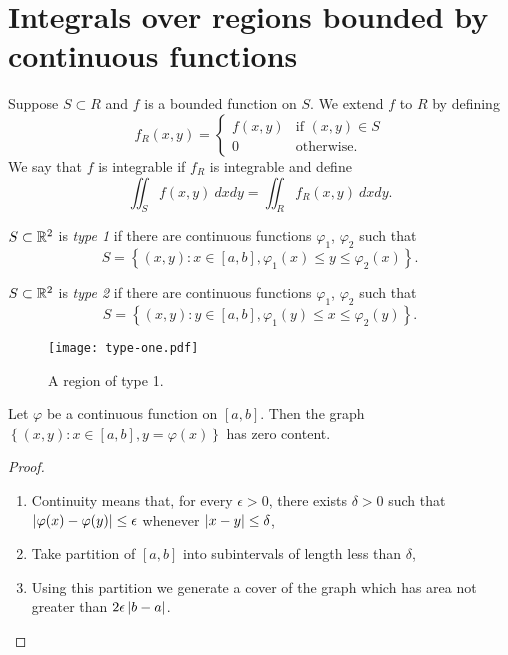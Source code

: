 \section{Integrals over regions bounded by continuous functions}

\begin{definition*}
    Suppose \(S\subset R\) and \(f\) is a bounded function on \(S\).
    We extend \(f\) to \(R\) by defining
    \[
        f_R(x,y) = \begin{cases}
            f(x,y) & \text{if \((x,y)\in S\)} \\
            0      & \text{otherwise}.
        \end{cases}
    \]
    We say that \(f\) is integrable if \(f_{R}\) is integrable and define
    \[
        \iint_{S} f(x,y) \ dxdy = \iint_{R} f_{R}(x,y) \ dx dy.
    \]
\end{definition*}


\begin{definition}[type 1]
    \(S \subset \mathbb{R}^2\) is \emph{type 1} if there are continuous functions \(\varphi_1\), \(\varphi_2\) such that
    \[
        S = \left\{(x,y): x \in [a,b], \varphi_1(x) \leq y \leq \varphi_2(x)\right\}.
    \]
\end{definition}
\begin{definition}[type 2]
    \(S \subset \mathbb{R}^2\) is \emph{type 2} if there are continuous functions \(\varphi_1\), \(\varphi_2\) such that
    \[
        S = \left\{(x,y): y \in [a,b], \varphi_1(y) \leq x \leq \varphi_2(y)\right\}.
    \]
\end{definition}



\begin{figure}
    \centering
    \texttt{[image: type-one.pdf]}
    \caption{A region of type 1.}
\end{figure}

\begin{theorem}
    Let \(\varphi\) be a continuous function on \([a,b]\).
    Then the graph
    \(\left\{(x,y): x\in [a,b], y=\varphi(x)\right\}\)
    has zero content.
\end{theorem}
\begin{proof}
    \begin{enumerate}
        \item Continuity means that, for every \(\epsilon>0\), there exists \(\delta>0\) such that \(\left|\varphi(x) - \varphi(y)\right|\leq \epsilon\) whenever \(\left|x-y\right|\leq \delta\),
        \item Take partition of \([a,b]\) into subintervals of length less than \(\delta\),
        \item Using this partition we generate a cover of the graph which has area not greater than \(2\epsilon \left|b-a\right|\).
    \end{enumerate}
\end{proof}

